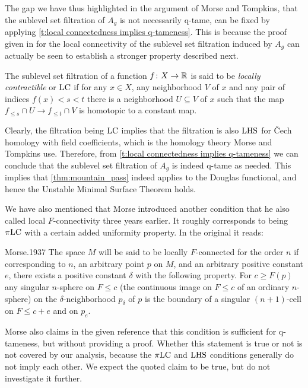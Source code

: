 The gap we have thus highlighted in the argument of Morse and Tompkins, that the sublevel set filtration of $A_g$ is not necessarily q-tame, can be fixed by applying \cref{t:local connectedness implies q-tameness}.
This is because the proof given in \cite[p.464]{Morse.1939} for the local connectivity of the sublevel set filtration induced by $A_g$ can actually be seen to establish a stronger property described next.

\begin{defi}
	The sublevel set filtration of a function $f \colon X \to \mathbb{R}$ is said to be \emph{locally contractible} or \emph{$\mathrm{LC}$} if for any $x \in X$, any neighborhood $V$ of $x$ and any pair of indices $f(x) < s < t$ there is a neighborhood $U \subseteq V$ of $x$ such that the map $f_{\leq s} \cap U \to f_{\leq t} \cap V$ is homotopic to a constant map.
\end{defi}

Clearly, the filtration being $\mathrm{LC}$ implies that the filtration is also $\mathrm{LHS}$ for \v{C}ech homology with field coefficients, which is the homology theory Morse and Tompkins use.
Therefore, from \cref{t:local connectedness implies q-tameness} we can conclude that the sublevel set filtration of $A_g$ is indeed \mbox{q-tame} as needed.
This implies that \cref{thm:mountain_pass} indeed applies to the Douglas functional, and hence the Unstable Minimal Surface Theorem holds.

We have also mentioned that Morse introduced another condition that he also called local $F$-connectivity three years earlier.
It roughly corresponds to being $\pi\mathrm{LC}$ with a certain added uniformity property.
In the original it reads:
\begin{displaycquote}[p.421--422]{Morse.1937}
	The space $M$ will be said to be locally $F$-connected for the order $n$ if corresponding to $n$, an arbitrary point $p$ on $M$, and an arbitrary positive constant $e$, there exists a positive constant $\delta$ with the following property.
	For $c \geq F(p)$ any singular $n$-sphere on $F \leq c$ (the continuous image on $F \leq c$ of an ordinary $n$-sphere) on the $\delta$-neighborhood $p_{\delta}$ of $p$ is the boundary of a singular $(n + 1)$-cell on $F \leq c + e$ and on $p_e$.
\end{displaycquote}
Morse also claims in the given reference that this condition is sufficient for q-tameness, but without providing a proof.
Whether this statement is true or not is not covered by our analysis, because the $\pi\mathrm{LC}$ and $\mathrm{LHS}$ conditions generally do not imply each other.
We expect the quoted claim to be true, but do not investigate it further.
